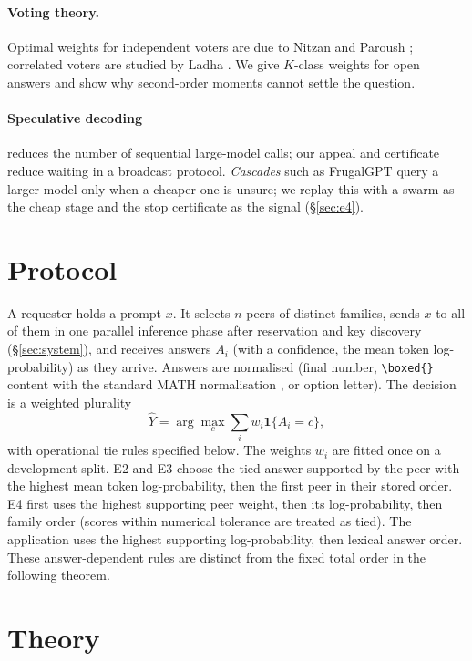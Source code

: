 \documentclass[11pt]{article}
\theoremstyle{definition}
\theoremstyle{remark}
\begin{document}
\paragraph{Voting theory.} Optimal weights for independent voters are due to Nitzan and Paroush
\cite{nitzan1982optimal}; correlated voters are studied by Ladha \cite{ladha1992condorcet}. We give
$K$-class weights for open answers and show why second-order moments cannot settle the question.
\paragraph{Speculative decoding} \cite{leviathan2023speculative} reduces the number of sequential large-model
calls; our appeal and certificate reduce waiting in a broadcast protocol. \emph{Cascades} such as FrugalGPT
\cite{chen2023frugalgpt} query a larger model only when a cheaper one is unsure; we replay this with a swarm
as the cheap stage and the stop certificate as the signal (\S\ref{sec:e4}).

\section{Protocol}\label{sec:protocol}
A requester holds a prompt $x$. It selects $n$ peers of distinct families, sends $x$ to all of them in one
parallel inference phase after reservation and key discovery (\S\ref{sec:system}), and receives answers $A_i$ (with a
confidence, the mean token log-probability) as they arrive.
Answers are normalised (final number, \texttt{\textbackslash boxed\{\}} content with the standard MATH
normalisation \cite{hendrycks2021math}, or option letter). The decision is a weighted plurality
\begin{equation}
\hat Y=\arg\max_c \sum_i w_i \mathbf 1\{A_i=c\},\label{eq:vote}
\end{equation}
with operational tie rules specified below. The weights $w_i$ are fitted once on a development split.
E2 and E3 choose the tied answer supported by the peer with the highest mean token log-probability,
then the first peer in their stored order. E4 first uses the highest supporting peer weight, then its
log-probability, then family order (scores within numerical tolerance are treated as tied). The application
uses the highest supporting log-probability, then lexical answer order. These answer-dependent rules
are distinct from the fixed total order in the following theorem.

\section{Theory}\label{sec:theory}
\end{document}
